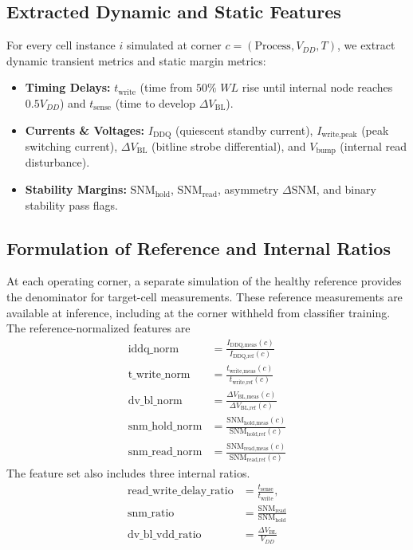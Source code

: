 \documentclass[conference]{IEEEtran}
\begin{document}
\subsection{Extracted Dynamic and Static Features}
For every cell instance $i$ simulated at corner $c = (\text{Process}, V_{DD}, T)$, we extract dynamic transient metrics and static margin metrics:
\begin{itemize}
    \item \textbf{Timing Delays:} $t_{\text{write}}$ (time from $50\%$ $WL$ rise until internal node reaches $0.5 V_{DD}$) and $t_{\text{sense}}$ (time to develop $\Delta V_{\text{BL}}$).
    \item \textbf{Currents \& Voltages:} $I_{\text{DDQ}}$ (quiescent standby current), $I_{\text{write,peak}}$ (peak switching current), $\Delta V_{\text{BL}}$ (bitline strobe differential), and $V_{\text{bump}}$ (internal read disturbance).
    \item \textbf{Stability Margins:} $\text{SNM}_{\text{hold}}$, $\text{SNM}_{\text{read}}$, asymmetry $\Delta \text{SNM}$, and binary stability pass flags.
\end{itemize}

\subsection{Formulation of Reference and Internal Ratios}
At each operating corner, a separate simulation of the healthy reference provides the denominator for target-cell measurements. These reference measurements are available at inference, including at the corner withheld from classifier training. The reference-normalized features are
\begin{align}
\text{iddq\_norm} &= \frac{I_{\text{DDQ,meas}}(c)}{I_{\text{DDQ,ref}}(c)} \\
\text{t\_write\_norm} &= \frac{t_{\text{write,meas}}(c)}{t_{\text{write,ref}}(c)} \\
\text{dv\_bl\_norm} &= \frac{\Delta V_{\text{BL,meas}}(c)}{\Delta V_{\text{BL,ref}}(c)} \\
\text{snm\_hold\_norm} &= \frac{\text{SNM}_{\text{hold,meas}}(c)}{\text{SNM}_{\text{hold,ref}}(c)} \\
\text{snm\_read\_norm} &= \frac{\text{SNM}_{\text{read,meas}}(c)}{\text{SNM}_{\text{read,ref}}(c)}
\end{align}
The feature set also includes three internal ratios.
\begin{align}
\text{read\_write\_delay\_ratio} &= \frac{t_{\text{sense}}}{t_{\text{write}}}, \\
\text{snm\_ratio} &= \frac{\text{SNM}_{\text{read}}}{\text{SNM}_{\text{hold}}} \\
\text{dv\_bl\_vdd\_ratio} &= \frac{\Delta V_{\text{BL}}}{V_{DD}}
\end{align}
\end{document}
